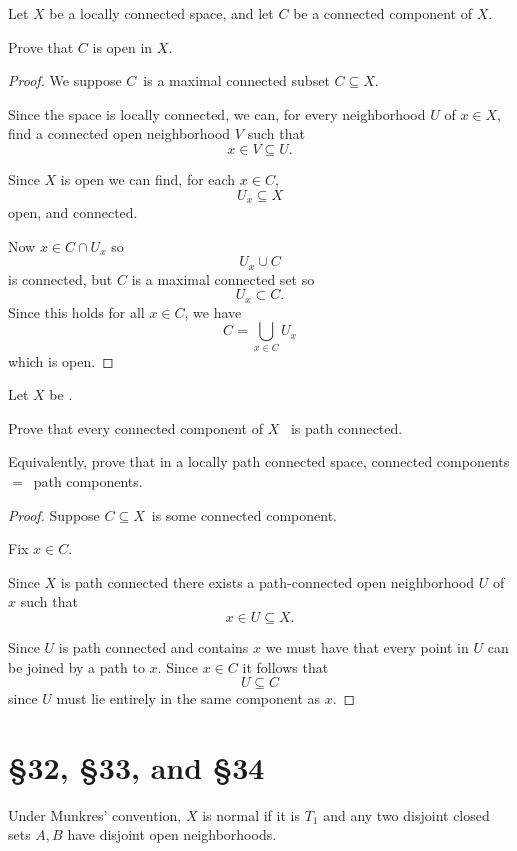 \documentclass[11pt]{article}
\begin{document}
\begin{prob}
    Let $X$ be a locally connected space, and 
    let $C$ be a connected component of $X$. 

    Prove that $C$ is open in $X$. 
\end{prob}
\begin{proof}
    We suppose $C$ is a maximal connected 
    subset $C \subseteq X$. 

    Since the space is locally connected, 
    we can, for every neighborhood $U$ of $x \in X$, 
    find a connected open neighborhood $V$
    such that 
    \[
        x \in V \subseteq U. 
    \]

    Since $X$ is open we can find, for each 
    $x \in C$, 
    \[
        U_x \subseteq X 
    \] 
    open, and connected.  

    Now $x \in C \cap U_x$ so 
    \[
        U_x \cup C 
    \]
    is connected, but 
    $C$ is a maximal connected set so 
    \[
        U_x \subset C. 
    \]
    Since this holds for all $x \in C$, we have 
    \[
        C = \bigcup_{x \in C} U_x  
    \]
    which is open.


\end{proof}

\begin{prob}
    Let $X$ be . 

    Prove that every connected component of $X$ 
    is path connected. 

    Equivalently, prove that in a locally path connected space, 
    connected components $=$ path components. 
\end{prob}
\begin{proof}
    Suppose $C \subseteq X$ is some 
    connected component. 

    Fix $x \in C$. 

    Since $X$ is path connected 
    there exists a path-connected open neighborhood $U$ of 
    $x$ such that 
    \[
        x \in U \subseteq X. 
    \]

    Since $U$ is path connected and contains $x$ 
    we must have that every point in $U$ can 
    be joined by a path to $x$. Since $x \in C$ it 
    follows that 
    \[
        U \subseteq C 
    \]
    since $U$ must lie entirely in the same component as $x$.
    
\end{proof}

\section{\S 32, \S 33, and \S 34}
Under Munkres' convention, 
$X$ is normal if it is $T_1$ and 
any two disjoint closed sets $A,B$ have 
disjoint open neighborhoods. 
\end{document}
